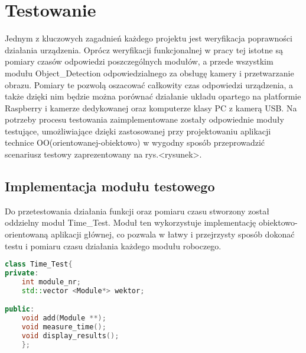 \chapter{Testowanie} %

Jednym z kluczowych zagadnień każdego projektu jest weryfikacja poprawności działania urządzenia. Oprócz weryfikacji funkcjonalnej w pracy tej istotne są pomiary czasów odpowiedzi poszczególnych modułów, a przede wszystkim modułu Object\_Detection odpowiedzialnego za obsługę kamery i przetwarzanie obrazu. Pomiary te pozwolą oszacować całkowity czas odpowiedzi urządzenia, a także dzięki nim będzie można porównać działanie układu opartego na platformie Raspberry i kamerze dedykowanej oraz komputerze klasy PC z kamerą USB.
Na potrzeby procesu testowania zaimplementowane zostały odpowiednie moduły testujące, umożliwiające dzięki zastosowanej przy projektowaniu aplikacji technice OO(orientowanej-obiektowo) w wygodny sposób przeprowadzić scenariusz testowy zaprezentowany na rys.<rysunek>.
\section{Implementacja modułu testowego}
Do przetestowania działania funkcji oraz pomiaru czasu  stworzony został oddzielny moduł Time\_Test. Moduł ten wykorzystuje implementację obiektowo-orientowaną aplikacji głównej, co pozwala w łatwy i przejrzysty sposób dokonać testu i pomiaru czasu działania każdego modułu roboczego.

\begin{lstlisting}[caption = {Klasa testująca}, label=TestClass, language=C++]
class Time_Test{
private:
	int module_nr;
	std::vector <Module*> wektor;

public:
	void add(Module **);
	void measure_time();
	void display_results();
	}; 
\end{lstlisting}

